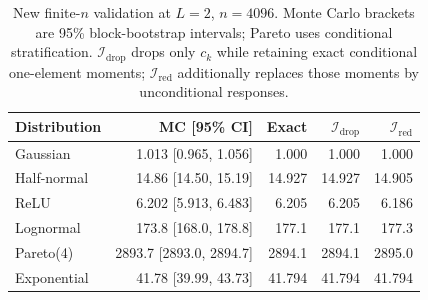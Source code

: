 \begin{table}[t]
\centering\footnotesize
\caption{New finite-$n$ validation at $L=2$, $n=4096$. Monte Carlo brackets are 95\% block-bootstrap intervals; Pareto uses conditional stratification. $\mathcal I_{\mathrm{drop}}$ drops only $c_k$ while retaining exact conditional one-element moments; $\mathcal I_{\mathrm{red}}$ additionally replaces those moments by unconditional responses.}\label{tab:revision-validation}
\begin{tabular}{@{}lrrrr@{}}\toprule
Distribution & MC [95\% CI] & Exact & $\mathcal I_{\mathrm{drop}}$ & $\mathcal I_{\mathrm{red}}$\\\midrule
Gaussian & 1.013 [0.965, 1.056] & 1.000 & 1.000 & 1.000\\
Half-normal & 14.86 [14.50, 15.19] & 14.927 & 14.927 & 14.905\\
ReLU & 6.202 [5.913, 6.483] & 6.205 & 6.205 & 6.186\\
Lognormal & 173.8 [168.0, 178.8] & 177.1 & 177.1 & 177.3\\
Pareto(4) & 2893.7 [2893.0, 2894.7] & 2894.1 & 2894.1 & 2895.0\\
Exponential & 41.78 [39.99, 43.73] & 41.794 & 41.794 & 41.794\\
\bottomrule\end{tabular}
\end{table}

